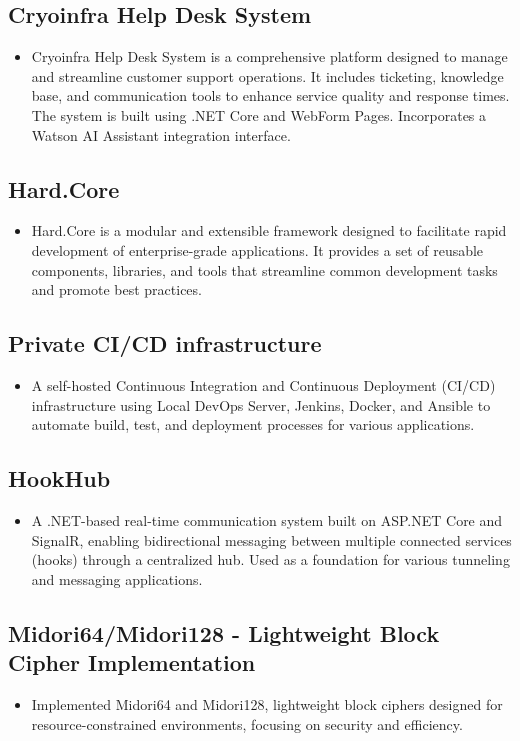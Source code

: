 \subsection*{Cryoinfra Help Desk System}
\begin{itemize}[leftmargin=12pt]
    \item Cryoinfra Help Desk System is a comprehensive platform designed to manage and streamline customer support operations. It includes ticketing, knowledge base, and communication tools to enhance service quality and response times. The system is built using .NET Core and WebForm Pages. Incorporates a Watson AI Assistant integration interface.
\end{itemize}

\subsection*{Hard.Core}
\begin{itemize}[leftmargin=12pt]
    \item Hard.Core is a modular and extensible framework designed to facilitate rapid development of enterprise-grade applications. It provides a set of reusable components, libraries, and tools that streamline common development tasks and promote best practices.
\end{itemize}

\subsection*{Private CI/CD infrastructure}
\begin{itemize}[leftmargin=12pt]
    \item A self-hosted Continuous Integration and Continuous Deployment (CI/CD) infrastructure using Local DevOps Server, Jenkins, Docker, and Ansible to automate build, test, and deployment processes for various applications.
\end{itemize}

\subsection*{HookHub}
\begin{itemize}[leftmargin=12pt]
    \item A .NET-based real-time communication system built on ASP.NET Core and SignalR, enabling bidirectional messaging between multiple connected services (hooks) through a centralized hub. Used as a foundation for various tunneling and messaging applications.
\end{itemize}

\subsection*{Midori64/Midori128 - Lightweight Block Cipher Implementation}
\begin{itemize}[leftmargin=12pt]
    \item Implemented Midori64 and Midori128, lightweight block ciphers designed for resource-constrained environments, focusing on security and efficiency.
\end{itemize}

